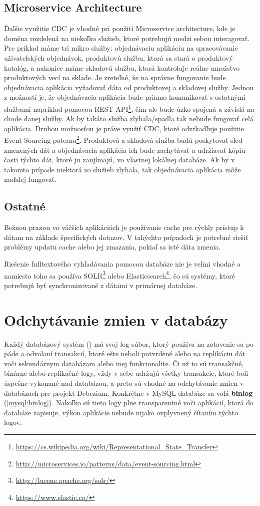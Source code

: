 \subsection{Microservice Architecture}
Ďalšie využitie CDC je vhodné pri použití Microservice architecture, kde je doména rozdelená na niekoľko služieb, ktoré potrebujú medzi sebou interagovať. Pre príklad máme tri mikro služby: objednávaciu aplikáciu na spracovávanie užívateľských objednávok, produktovú službu, ktorá sa stará o produktový katalóg, a nakoniec máme skladovú službu, ktorá kontroluje reálne množstvo produktových vecí na sklade. Je zreteľné, že na správne fungovanie bude objednávacia aplikácia vyžadovať dáta od produktovej a skladovej služby. Jednou z možností je, že objednávacia aplikácia bude priamo komunikovať s ostatnými službami napríklad pomocou REST API\footnote{\url{https://cs.wikipedia.org/wiki/Representational_State_Transfer}}, čím ale bude úzko spojená a závislá na chode danej služby. Ak by takáto služba zlyhala/spadla tak nebude fungovať celá aplikácia. Druhou možnosťou je práve využiť CDC, ktoré odzrkadľuje použitie Event Sourcing paternu\footnote{\url{http://microservices.io/patterns/data/event-sourcing.html}}. Produktová a skladová služba budú poskytovať sled zmenených dát a objednávacia aplikácia ich bude zachytávať a udržiavať kópiu časti týchto dát, ktoré ju zaujímajú, vo vlastnej lokálnej databáze. Ak by v takomto prípade niektorá zo služieb zlyhala, tak objednávacia aplikácia môže naďalej fungovať.

\subsection{Ostatné}
Bežnou praxou vo väčších aplikáciách je používanie cache pre rýchly prístup k dátam na základe špecifických dotazov. V takýchto prípadoch je potrebné riešiť problémy updatu cache alebo jej zmazania, pokiaľ sa isté dáta zmenia.

Riešenie fulltextového vyhľadávania pomocou databáze nie je veľmi vhodné a namiesto toho sa používa SOLR\footnote{\url{http://lucene.apache.org/solr/}} alebo Elasticsearch\footnote{\url{https://www.elastic.co/}}, čo sú systémy, ktoré potrebujú byť synchronizované z dátami v primárnej databáze. 


\section{Odchytávanie zmien v databázy}
Každý databázový systém () má svoj log súbor, ktorý používa na zotavenie sa po páde a odvolaní transakcií, ktoré ešte neboli potvrdené alebo na replikáciu dát voči sekundárnym databázam alebo inej funkcionalite. Či už to sú transakčné, binárne alebo replikačné logy, vždy v sebe udržujú všetky transakcie, ktoré boli úspešne vykonané nad databázou, a preto sú vhodné na odchytávanie zmien v databázach pre projekt Debezium. Konkrétne v MySQL databáze sa volá \textbf{binlog} (\ref{mysql:binlog}). Nakoľko sú tieto logy plne transparentné voči aplikácií, ktorá do databáze zapisuje, výkon aplikácie nebude nijako ovplyvnený čítaním týchto logov.

